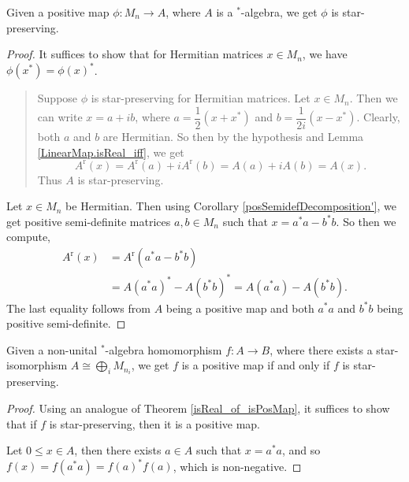  \begin{theorem}\label{isReal_of_isPosMap}
  \leanok
  Given a positive map $\phi\colon M_n \to A$, where $A$ is a $^*$-algebra, we get $\phi$ is star-preserving.
 \end{theorem}
 \begin{proof}
  \leanok
  It suffices to show that for Hermitian matrices $x\in M_n$, we have $\phi(x^*)=\phi(x)^*$.
  \begin{quote}
   Suppose $\phi$ is star-preserving for Hermitian matrices.
   Let $x\in M_n$. Then we can write $x=a+ib$, where $a=\dfrac{1}{2}(x+x^*)$ and $b=\dfrac{1}{2i}(x-x^*)$. Clearly, both $a$ and $b$ are Hermitian. So then by the hypothesis and Lemma \ref{LinearMap.isReal_iff}, we get
   \[A^\operatorname{r}(x)=A^{\operatorname{r}}(a)+iA^{\operatorname{r}}(b)=A(a)+iA(b)=A(x).\]
   Thus $A$ is star-preserving.
  \end{quote}
  Let $x\in M_n$ be Hermitian. Then using Corollary \ref{posSemidefDecomposition'}, we get positive semi-definite matrices $a,b\in{M_n}$ such that $x=a^*a-b^*b$. So then we compute,
  \begin{align*}
   A^{\operatorname{r}}(x) &={A}^{\operatorname{r}}(a^*a-b^*b)\\
    &= {A(a^*a)}^*-{A(b^*b)}^*=A(a^*a)-A(b^*b).
  \end{align*}
  The last equality follows from $A$ being a positive map and both $a^*a$ and $b^*b$ being positive semi-definite.
 \end{proof}

 \begin{corollary}\label{NonUnitalAlgHom.isPosMap_iff}
  \leanok
  Given a non-unital $^*$-algebra homomorphism $f\colon A \to B$, where there exists a star-isomorphism $A\cong\bigoplus_iM_{n_i}$, we get $f$ is a positive map if and only if $f$ is star-preserving.
 \end{corollary}
 \begin{proof}\leanok
  Using an analogue of Theorem \ref{isReal_of_isPosMap}, it suffices to show that if $f$ is star-preserving, then it is a positive map.
  
  Let $0\leq x\in A$, then there exists $a\in A$ such that $x=a^*a$, and so $f(x)=f(a^*a)=f(a)^*f(a)$, which is non-negative.
 \end{proof}
